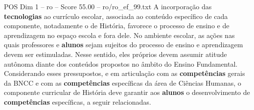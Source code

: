 \begin{textsample}{POS Dim 1 – ro – Score 55.00 – ro/ro\_ef\_99.txt}
A incorporação das \textbf{tecnologias} ao currículo escolar, associada ao conteúdo específico de cada componente, notadamente o de História, favorece o processo de ensino e de aprendizagem no espaço escola e fora dele.
No ambiente escolar, as ações nas quais professores e \textbf{alunos} sejam sujeitos do processo de ensino e aprendizagem devem ser estimuladas.
Nesse sentido, eles próprios devem assumir atitude autônoma diante dos conteúdos propostos no âmbito do Ensino Fundamental.
Considerando esses pressupostos, e em articulação com as \textbf{competências} gerais da BNCC e com as \textbf{competências} específicas da área de Ciências Humanas, o componente curricular de História deve garantir aos \textbf{alunos} o desenvolvimento de \textbf{competências} específicas, a seguir relacionadas.

\end{textsample}
